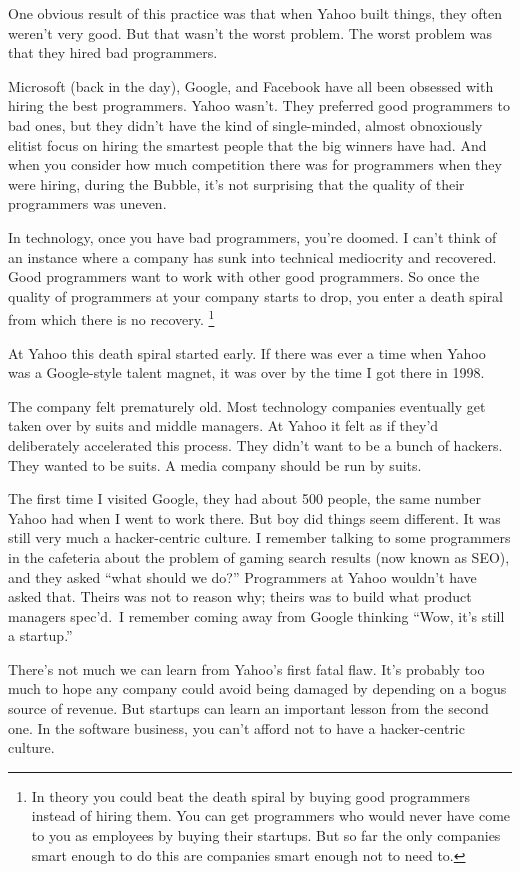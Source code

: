 One obvious result of this practice was that when Yahoo built things,
they often weren't very good. But that wasn't the worst problem. The
worst problem was that they hired bad programmers.

Microsoft (back in the day), Google, and Facebook have all been obsessed
with hiring the best programmers. Yahoo wasn't. They preferred good
programmers to bad ones, but they didn't have the kind of single-minded,
almost obnoxiously elitist focus on hiring the smartest people that the
big winners have had. And when you consider how much competition there
was for programmers when they were hiring, during the Bubble, it's not
surprising that the quality of their programmers was uneven.

In technology, once you have bad programmers, you're doomed. I can't
think of an instance where a company has sunk into technical mediocrity
and recovered. Good programmers want to work with other good
programmers. So once the quality of programmers at your company starts
to drop, you enter a death spiral from which there is no recovery.
\footnote{In theory you could beat the death spiral by buying good
programmers instead of hiring them. You can get programmers who would
never have come to you as employees by buying their startups. But so far
the only companies smart enough to do this are companies smart enough
not to need to.}

At Yahoo this death spiral started early. If there was ever a time when
Yahoo was a Google-style talent magnet, it was over by the time I got
there in 1998.

The company felt prematurely old. Most technology companies eventually
get taken over by suits and middle managers. At Yahoo it felt as if
they'd deliberately accelerated this process. They didn't want to be a
bunch of hackers. They wanted to be suits. A media company should be run
by suits.

The first time I visited Google, they had about 500 people, the same
number Yahoo had when I went to work there. But boy did things seem
different. It was still very much a hacker-centric culture. I remember
talking to some programmers in the cafeteria about the problem of gaming
search results (now known as SEO), and they asked ``what should we do?''
Programmers at Yahoo wouldn't have asked that. Theirs was not to reason
why; theirs was to build what product managers spec'd.~I remember coming
away from Google thinking ``Wow, it's still a startup.''

There's not much we can learn from Yahoo's first fatal flaw. It's
probably too much to hope any company could avoid being damaged by
depending on a bogus source of revenue. But startups can learn an
important lesson from the second one. In the software business, you
can't afford not to have a hacker-centric culture.

